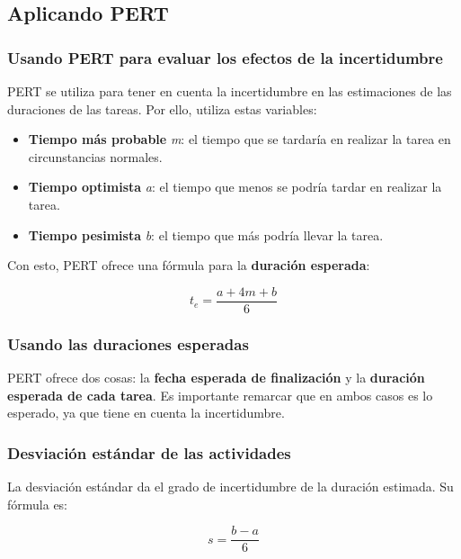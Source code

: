 \documentclass[12pt]{article}
\begin{document}
\subsection{Aplicando PERT}
\label{7.10.0}

\subsubsection{Usando PERT para evaluar los efectos de la incertidumbre}
\label{7.10.1}

{PERT se utiliza para tener en cuenta la incertidumbre en las estimaciones de las duraciones de las tareas. Por ello, utiliza estas variables:}

\begin{itemize}
    \item {\textbf{Tiempo más probable} \textit{m}: el tiempo que se tardaría en realizar la tarea en circunstancias normales.}
    \item {\textbf{Tiempo optimista} \textit{a}: el tiempo que menos se podría tardar en realizar la tarea.}
    \item {\textbf{Tiempo pesimista} \textit{b}: el tiempo que más podría llevar la tarea.}
\end{itemize}

{Con esto, PERT ofrece una fórmula para la \textbf{duración esperada}:}

\begin{equation}
    t_e = \frac{a + 4m + b}{6}
\end{equation}

\subsubsection{Usando las duraciones esperadas}
\label{7.10.2}

{PERT ofrece dos cosas: la \textbf{fecha esperada de finalización} y la \textbf{duración esperada de cada tarea}. Es importante remarcar que en ambos casos es lo esperado, ya que tiene en cuenta la incertidumbre.}

\subsubsection{Desviación estándar de las actividades}
\label{7.10.3}

{La desviación estándar da el grado de incertidumbre de la duración estimada. Su fórmula es:}

\begin{equation}
    s = \frac{b - a}{6}
\end{equation}
\end{document}
